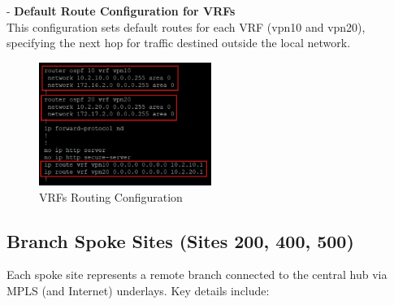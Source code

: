 \documentclass[12pt,english]{report}
\begin{document}
- \textbf{Default Route Configuration for VRFs} \\
    This configuration sets default routes for each VRF (vpn10 and vpn20), specifying the next hop for traffic destined outside the local network.
\begin{figure}[H]
    \centering
    \includegraphics[width= 0.5\textwidth]{chapitre 3/11.png}
    \caption{VRFs Routing Configuration}
    \label{fig: VRFs Routing Configuration}
\end{figure}
\newpage
\subsection{Branch Spoke Sites (Sites 200, 400, 500)}
Each spoke site represents a remote branch connected to the central hub via MPLS (and Internet) underlays.  Key details include:
\end{document}
